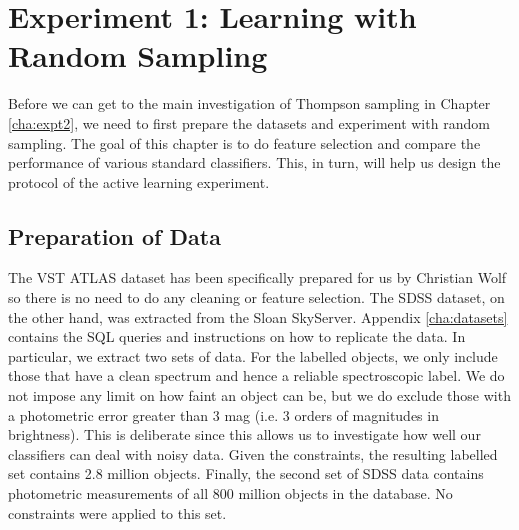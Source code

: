 
\chapter{Experiment 1: Learning with Random Sampling}
\label{cha:expt1}

Before we can get to the main investigation of Thompson sampling in Chapter \ref{cha:expt2},
we need to first prepare the datasets and experiment with random sampling. The goal of
this chapter is to do feature selection and compare the performance of various standard
classifiers. This, in turn, will help us design the protocol
of the active learning experiment.

\section{Preparation of Data}
\label{sec:prep}

The VST ATLAS dataset has been specifically prepared for us by Christian Wolf so there
is no need to do any cleaning or feature selection.
The SDSS dataset, on the other hand, was extracted from the Sloan SkyServer. Appendix
\ref{cha:datasets} contains the SQL queries and instructions on how to replicate
the data. In particular, we extract two sets of data.
For the labelled objects, we only include those that have a clean
spectrum and hence a reliable spectroscopic label. We do not impose any limit on how faint
an object can be, but we do exclude those with a photometric error greater than 3 mag (i.e.
3 orders of magnitudes in brightness). This is deliberate since this allows us to 
investigate how well our classifiers can deal with noisy data.
Given the constraints, the resulting labelled set contains
2.8 million objects. Finally, the second set of SDSS data contains photometric measurements
of all 800 million objects in the database. No constraints were applied to this set.

